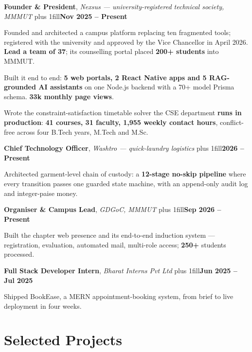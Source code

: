 \documentclass[a4paper,10pt]{article}
\newcommand{\pushright}{\hskip 0pt plus 1fill\relax}
\newcommand{\entry}[3]{%
  \textbf{#1}, \textit{#2}\pushright\textbf{#3}%
}
\begin{document}
\entry{Founder \& President}{Nexsus --- university-registered technical society, MMMUT}{Nov 2025 -- Present}
\begin{bullets}
  \item Founded and architected a campus platform replacing ten fragmented tools; registered with the university and approved by the Vice Chancellor in April 2026. \textbf{Lead a team of 37}; its counselling portal placed \textbf{200+ students} into MMMUT.
  \item Built it end to end: \textbf{5 web portals, 2 React Native apps and 5 RAG-grounded AI assistants} on one Node.js backend with a 70+ model Prisma schema. \textbf{33k monthly page views}.
  \item Wrote the constraint-satisfaction timetable solver the CSE department \textbf{runs in production}: \textbf{41 courses, 31 faculty, 1,955 weekly contact hours}, conflict-free across four B.Tech years, M.Tech and M.Sc.
\end{bullets}

\entry{Chief Technology Officer}{Washtro --- quick-laundry logistics}{2026 -- Present}
\begin{bullets}
  \item Architected garment-level chain of custody: a \textbf{12-stage no-skip pipeline} where every transition passes one guarded state machine, with an append-only audit log and integer-paise money.
\end{bullets}

\entry{Organiser \& Campus Lead}{GDGoC, MMMUT}{Sep 2026 -- Present}
\begin{bullets}
  \item Built the chapter web presence and its end-to-end induction system --- registration, evaluation, automated mail, multi-role access; \textbf{250+} students processed.
\end{bullets}

\entry{Full Stack Developer Intern}{Bharat Interns Pvt Ltd}{Jun 2025 -- Jul 2025}
\begin{bullets}
  \item Shipped BookEase, a MERN appointment-booking system, from brief to live deployment in four weeks.
\end{bullets}

\section{Selected Projects}
\end{document}
